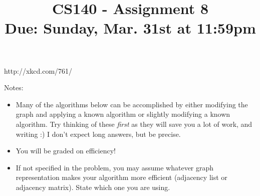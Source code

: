 \documentclass[11pt]{article}
\title{CS140 - Assignment 8\\\small{Due: Sunday,  Mar. 31st at 11:59pm}}
\author{}
\date{}
\begin{document}
\maketitle

\begin{center}
{\footnotesize http://xkcd.com/761/}
\end{center}

Notes: 
\begin{itemize}
\item Many of the algorithms below can be accomplished by either modifying the graph and applying a known algorithm or slightly modifying a known algorithm.  Try thinking of these \emph{first} as they will save you a lot of work, and writing :)  I don't expect long answers, but be precise.
\item You will be graded on efficiency!
\item If not specified in the problem, you may assume whatever graph representation makes your algorithm more efficient (adjacency list or adjacency matrix).  State which one you are using.
\end{itemize}
\end{document}
